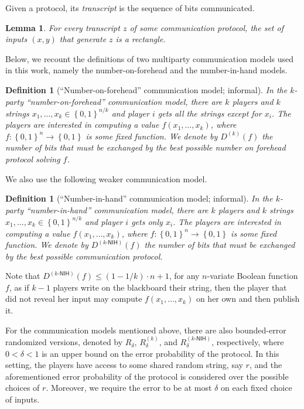 \documentclass[10pt,a4paper]{article}
\newtheorem{definition}[theorem]{Definition}
\newtheorem{lemma}[theorem]{Lemma}
\newcommand{\bool}{\left\{0,1\right\}}
\newcommand{\prn}[1]{\left(#1\right)}
\newcommand{\cprn}[1]{\!\left(#1\right)}
\begin{document}
	Given a protocol, its \emph{transcript} is the sequence of bits communicated.
	
	\begin{lemma}
	    For every transcript $z$ of some communication protocol, the set of inputs $(x,y)$ that generate $z$ is a rectangle.
	\end{lemma}
	
%
%
%
	
%
%
%

    Below, we recount the definitions of two multiparty communication models used in this work, namely the number-on-forehead and the number-in-hand models.
	
	\begin{definition}[``Number-on-forehead'' communication model; informal]
	    In the $k$-party ``number-on-forehead'' communication model, 
%
	    there are $k$ players and $k$ strings $x_1,\dots,x_k\in\bool^{n/k}$ and player $i$ gets all the strings except for $x_i$. The players are interested in computing a value $f\cprn{x_1,\dots,x_k}$, where $f\colon\bool^{n}\to\bool$ is some fixed function. 
%
	    We denote by $D^{(k)}(f)$ the number of bits that must be exchanged by the best possible number on forehead protocol solving $f$.
    \end{definition}
        
%
    
    We also use the following weaker communication model.
    
    \begin{definition}[``Number-in-hand'' communication model; informal]
	    In the $k$-party ``number-in-hand'' communication model,
%
	    there are $k$ players and $k$ strings $x_1,\dots,x_k\in\bool^{n/k}$ and player $i$ gets only $x_i$.
%
	    The players are interested in computing a value $f\cprn{x_1,\dots,x_k}$, where $f\colon\bool^{n}\to\bool$ is some fixed function.
%
	    We denote by $D^{(k\text{-}\mathsf{NIH})}(f)$ the number of bits that must be exchanged by the best possible communication protocol.
    \end{definition}
    
    Note that $D^{(k\text{-}\mathsf{NIH})}(f)\leq\prn{1-1/k}\cdot n+1$, for any $n$-variate Boolean function $f$, as if $k-1$ players write on the blackboard their string, then the player that did not reveal her input may compute $f\cprn{x_1,\dots,x_k}$ on her own and then publish it.
    
    For the communication models mentioned above, there are also bounded-error randomized versions, denoted by $R_\delta$, $R_\delta^{(k)}$, and $R^{(k\text{-}\mathsf{NIH})}_\delta$, respectively, where $0<\delta<1$ is an upper bound on the error probability of the protocol. In this setting, the players have access to some shared random string, say $r$, and the aforementioned error probability of the protocol is considered over the possible choices of $r$. Moreover, we require the error to be at most $\delta$ on each fixed choice of inputs.
    
\end{document}
